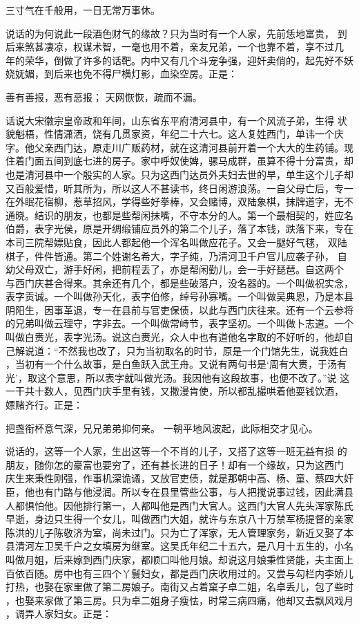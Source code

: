 三寸气在千般用，一日无常万事休。

说话的为何说此一段酒色财气的缘故？只为当时有一个人家，先前恁地富贵，
到后来煞甚凄凉，权谋术智，一毫也用不着，亲友兄弟，一个也靠不着，享不过几
年的荣华，倒做了许多的话靶。内中又有几个斗宠争强，迎奸卖俏的，起先好不妖
娆妩媚，到后来也免不得尸横灯影，血染空房。正是：

善有善报，恶有恶报；
天网恢恢，疏而不漏。

话说大宋徽宗皇帝政和年间，山东省东平府清河县中，有一个风流子弟，生得
状貌魁梧，性情潇洒，饶有几贯家资，年纪二十六七。这人复姓西门，单讳一个庆
字。他父亲西门达，原走川广贩药材，就在这清河县前开着一个大大的生药铺。现
住着门面五间到底七进的房子。家中呼奴使婢，骡马成群，虽算不得十分富贵，却
也是清河县中一个殷实的人家。只为这西门达员外夫妇去世的早，单生这个儿子却
又百般爱惜，听其所为，所以这人不甚读书，终日闲游浪荡。一自父母亡后，专一
在外眠花宿柳，惹草招风，学得些好拳棒，又会赌博，双陆象棋，抹牌道字，无不
通晓。结识的朋友，也都是些帮闲抹嘴，不守本分的人。第一个最相契的，姓应名
伯爵，表字光侯，原是开绸缎铺应员外的第二个儿子，落了本钱，跌落下来，专在
本司三院帮嫖贴食，因此人都起他一个浑名叫做应花子。又会一腿好气毬，
双陆棋子，件件皆通。第二个姓谢名希大，字子纯，乃清河卫千户官儿应袭子孙，
自幼父母双亡，游手好闲，把前程丢了，亦是帮闲勤儿，会一手好琵琶。自这两个
与西门庆甚合得来。其余还有几个，都是些破落户，没名器的。一个叫做祝实念，
表字贡诚。一个叫做孙天化，表字伯修，绰号孙寡嘴。一个叫做吴典恩，乃是本县
阴阳生，因事革退，专一在县前与官吏保债，以此与西门庆往来。还有一个云参将
的兄弟叫做云理守，字非去。一个叫做常峙节，表字坚初。一个叫做卜志道。一个
叫做白赉光，表字光汤。说这白赉光，众人中也有道他名字取的不好听的，他却自
己解说道：“不然我也改了，只为当初取名的时节，原是一个门馆先生，说我姓白
，当初有一个什么故事，是白鱼跃入武王舟。又说有两句书是‘周有大赉，于汤有
光’，取这个意思，所以表字就叫做光汤。我因他有这段故事，也便不改了。”说
这一干共十数人，见西门庆手里有钱，又撒漫肯使，所以都乱撮哄着他耍钱饮酒，
嫖赌齐行。正是：

把盏衔杯意气深，兄兄弟弟抑何亲。
一朝平地风波起，此际相交才见心。

说话的，这等一个人家，生出这等一个不肖的儿子，又搭了这等一班无益有损
的朋友，随你怎的豪富也要穷了，还有甚长进的日子！却有一个缘故，只为这西门
庆生来秉性刚强，作事机深诡谲，又放官吏债，就是那朝中高、杨、童、蔡四大奸
臣，他也有门路与他浸润。所以专在县里管些公事，与人把搅说事过钱，因此满县
人都惧怕他。因他排行第一，人都叫他是西门大官人。这西门大官人先头浑家陈氏
早逝，身边只生得一个女儿，叫做西门大姐，就许与东京八十万禁军杨提督的亲家
陈洪的儿子陈敬济为室，尚未过门。只为亡了浑家，无人管理家务，新近又娶了本
县清河左卫吴千户之女填房为继室。这吴氏年纪二十五六，是八月十五生的，小名
叫做月姐，后来嫁到西门庆家，都顺口叫他月娘。却说这月娘秉性贤能，夫主面上
百依百随。房中也有三四个丫鬟妇女，都是西门庆收用过的。又尝与勾栏内李娇儿
打热，也娶在家里做了第二房娘子。南街又占着窠子卓二姐，名卓丢儿，包了些时
，也娶来家做了第三房。只为卓二姐身子瘦怯，时常三病四痛，他却又去飘风戏月
，调弄人家妇女。正是：

